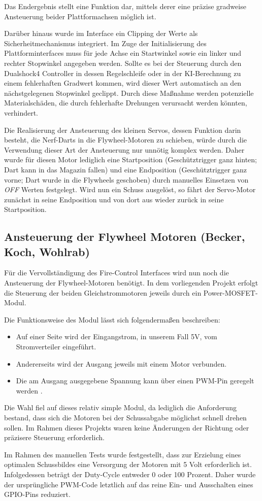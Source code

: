 Das Endergebnis stellt eine Funktion dar, mittels derer eine präzise gradweise Ansteuerung beider Plattformachsen möglich ist.

Darüber hinaus wurde im Interface ein Clipping der Werte als Sicherheitmechanismus integriert. Im Zuge der Initialisierung des Plattforminterfaces muss für jede Achse ein Startwinkel sowie ein linker und rechter Stopwinkel angegeben werden.
Sollte es bei der Steuerung durch den Dualshock4 Controller in dessen Regelschleife oder in der KI-Berechnung zu einem fehlerhaften Gradwert kommen, wird dieser Wert automatisch an den nächstgelegenen Stopwinkel geclippt. 
Durch diese Maßnahme werden potenzielle Materialschäden, die durch fehlerhafte Drehungen verursacht werden könnten, verhindert.

Die Realisierung der Ansteuerung des kleinen Servos, dessen Funktion darin besteht, die Nerf-Darts in die Flywheel-Motoren zu schieben, würde durch die Verwendung dieser Art der Ansteuerung nur unnötig komplex werden.
Daher wurde für diesen Motor lediglich eine Startposition (Geschütztrigger ganz hinten; Dart kann in das Magazin fallen) und eine Endposition (Geschütztrigger ganz vorne; Dart wurde in die Flywheels geschoben) durch manuelles Einsetzen von \textit{OFF} Werten festgelegt.
Wird nun ein Schuss ausgelöst, so fährt der Servo-Motor zunächst in seine Endposition und von dort aus wieder zurück in seine Startposition.

\subsection{Ansteuerung der Flywheel Motoren (Becker, Koch, Wohlrab)}

Für die Vervollständigung des Fire-Control Interfaces wird nun noch die Ansteuerung der Flywheel-Motoren benötigt.
In dem vorliegenden Projekt erfolgt die Steuerung der beiden Gleichstrommotoren jeweils durch ein Power-MOSFET-Modul.

Die Funktionsweise des Modul lässt sich folgendermaßen beschreiben:

\begin{itemize}
    \item Auf einer Seite wird der Eingangstrom, in unserem Fall 5V, vom Stromverteiler eingeführt.
    \item Andererseits wird der Ausgang jeweils mit einem Motor verbunden.
    \item Die am Ausgang ausgegebene Spannung kann über einen PWM-Pin geregelt werden \cite{esp_platform_flywheel_motor}.
\end{itemize}

Die Wahl fiel auf dieses relativ simple Modul, da lediglich die Anforderung bestand, dass sich die Motoren bei der Schussabgabe möglichst schnell drehen sollen.
Im Rahmen dieses Projekts waren keine Änderungen der Richtung oder präzisere Steuerung erforderlich.

Im Rahmen des manuellen Tests wurde festgestellt, dass zur Erzielung eines optimalen Schussbildes eine Versorgung der Motoren mit 5 Volt erforderlich ist. 
Infolgedessen beträgt der Duty-Cycle entweder 0 oder 100 Prozent.
Daher wurde der ursprüngliche PWM-Code letztlich auf das reine Ein- und Ausschalten eines GPIO-Pins reduziert.